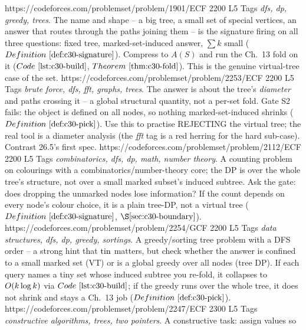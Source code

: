 \begin{mixedset}
    {https://codeforces.com/problemset/problem/1901/E}{CF 2200 L5}
    {Tags \emph{dfs, dp, greedy, trees}. The name and shape -- a big tree, a small set of special
     vertices, an answer that routes through the paths joining them -- is the signature firing on all
     three questions: fixed tree, marked-set-induced answer, \(\sum k\) small (\(\defref{c30-signature}\)).
     Compress to \(A(S)\) and run the Ch.~13 fold on it (\(\coderef{c30-build}\), \(\thmref{c30-fold}\)).
     This is the genuine virtual-tree case of the set.}
    {https://codeforces.com/problemset/problem/2253/E}{CF 2200 L5}
    {Tags \emph{brute force, dfs, fft, graphs, trees}. The answer is about the tree's \emph{diameter}
     and paths crossing it -- a global structural quantity, not a per-set fold. Gate S2 fails: the object
     is defined on all nodes, so nothing marked-set-induced shrinks (\(\defref{c30-pick}\)). Use this to
     practise REJECTING the virtual tree; the real tool is a diameter analysis (the \emph{fft} tag is a
     red herring for the hard sub-case). Contrast 26.5's first spec.}
    {https://codeforces.com/problemset/problem/2112/E}{CF 2200 L5}
    {Tags \emph{combinatorics, dfs, dp, math, number theory}. A counting problem on colourings with a
     combinatorics/number-theory core; the DP is over the whole tree's structure, not over a small
     marked subset's induced subtree. Ask the gate: does dropping the unmarked nodes lose information?
     If the count depends on every node's colour choice, it is a plain tree-DP, not a virtual tree
     (\(\defref{c30-signature}\), \(\secref{c30-boundary}\)).}
    {https://codeforces.com/problemset/problem/2254/G}{CF 2200 L5}
    {Tags \emph{data structures, dfs, dp, greedy, sortings}. A greedy/sorting tree problem with a DFS
     order -- a strong hint that \(\operatorname{tin}\) matters, but check whether the answer is confined to a small
     marked set (VT) or is a global greedy over all nodes (tree DP). If each query names a tiny set whose
     induced subtree you re-fold, it collapses to \(O(k\log k)\) via \(\coderef{c30-build}\); if the
     greedy runs over the whole tree, it does not shrink and stays a Ch.~13 job (\(\defref{c30-pick}\)).}
    {https://codeforces.com/problemset/problem/2247/E}{CF 2300 L5}
    {Tags \emph{constructive algorithms, trees, two pointers}. A constructive task: assign values so
}
\end{mixedset}
